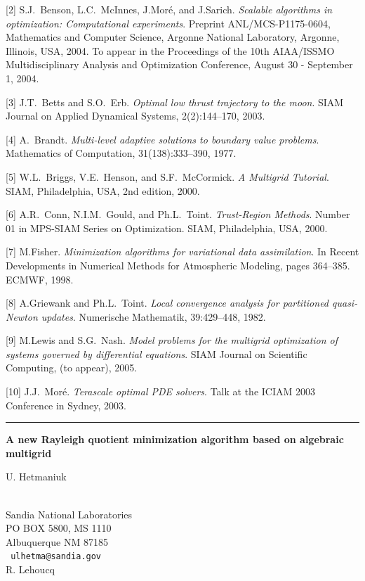 \documentclass[twosided]{report}
\begin{document}
[2] S.J.~Benson, L.C.~McInnes, J.Mor\'{e}, and J.Sarich. {\em Scalable
algorithms in optimization: Computational experiments}. Preprint
ANL/MCS-P1175-0604, Mathematics and Computer Science, Argonne National
Laboratory, Argonne, Illinois, USA, 2004. To appear in the Proceedings
of the 10th AIAA/ISSMO Multidisciplinary Analysis and Optimization
Conference, August 30 - September 1, 2004.

[3] J.T.~Betts and S.O.~Erb. {\em Optimal low thrust trajectory to the moon}.
SIAM Journal on Applied Dynamical Systems, 2(2):144--170, 2003.

[4] A.~Brandt. {\em Multi-level adaptive solutions to boundary value
problems}. Mathematics of Computation, 31(138):333--390, 1977.

[5] W.L.~Briggs, V.E.~Henson, and S.F.~McCormick. {\em A Multigrid Tutorial}.
SIAM, Philadelphia, USA, 2nd edition, 2000.

[6] A.R.~Conn, N.I.M.~Gould, and Ph.L.~Toint. {\em Trust-Region Methods}.
Number 01 in MPS-SIAM Series on Optimization. SIAM, Philadelphia, USA,
2000.

[7] M.Fisher. {\em Minimization algorithms for variational data
assimilation}. In Recent Developments in Numerical Methods for
Atmospheric Modeling, pages 364--385. ECMWF, 1998.

[8] A.Griewank and Ph.L.~Toint. {\em Local convergence analysis for
partitioned quasi-Newton updates}. Numerische Mathematik, 39:429--448,
1982.

[9] M.Lewis and S.G.~Nash. {\em Model problems for the multigrid
optimization of systems governed by differential equations}.
SIAM Journal on Scientific Computing, (to appear), 2005.

[10] J.J.~Mor\'{e}. {\em Terascale optimal PDE solvers}.
Talk at the ICIAM 2003 Conference in Sydney, 2003.


\begin{center} \rule{6in}{1pt} \end{center}
\newpage	%



\begin{center}
{\large			\label{hetmaniuk}
{\bf
A new Rayleigh quotient minimization algorithm based on algebraic
multigrid
}

U. Hetmaniuk} \\
Sandia National Laboratories
\\
PO BOX 5800, MS 1110
\\
Albuquerque NM 87185
\\ {\tt
ulhetma@sandia.gov
}
\\
R. Lehoucq
\end{center}
\end{document}
